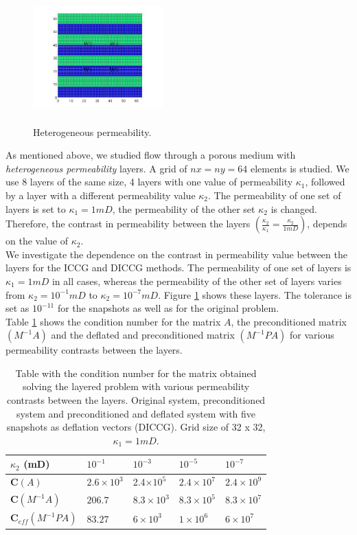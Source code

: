 \documentclass{ecmorXV}
\begin{document}
\normalsize
\begin{figure}[!h]
\centering 
\includegraphics[width=5cm,height=5cm,keepaspectratio]
{perm_he_1.jpg}
\caption{ Heterogeneous permeability.}\label{fig:hep}
\end{figure}
\normalsize
As mentioned above, we studied flow through a porous medium with \emph{heterogeneous permeability} layers. A grid of
$nx = ny = 64$ elements is studied. We use 8 layers of the same size, 
4 layers with one value of permeability $\kappa_1$, followed by a layer with a different permeability value $\kappa_2$. 
The permeability of one set of layers is set to $\kappa_1=1mD$, the permeability of the other set $\kappa_2$ is changed. 
Therefore, the contrast in permeability between the layers $(\frac{\kappa_2}{\kappa_1}=\frac{\kappa_2}{1mD})$,
depends on the value of $\kappa_2$.\\
We investigate the dependence on the contrast in permeability value between the layers for the ICCG and DICCG methods.
The permeability of one set of layers is $\kappa_1=1mD$ in all cases, whereas the permeability of the other set of 
layers varies from $\kappa_2=10^{-1}mD$ to $\kappa_2=10^{-7}mD$. 
Figure \ref{fig:hep} shows these layers. The tolerance is set as $10^{-11}$ for the snapshots as well as for the original problem.\\ 
\normalsize
Table \ref{table:condn} shows the condition number for the matrix $A$, the preconditioned matrix $(M^{-1}A)$ and the deflated and preconditioned matrix 
$(M^{-1}PA)$ for various permeability contrasts between the layers.\\
\renewcommand{\arraystretch}{1.5}
\begin{table}[!ht]
\centering
\begin{tabular}{ |p{3cm}|p{1.5cm}|p{1.5cm}|p{1.5cm}|p{1.5cm}|  } 
 \hline
  $\kappa_2$ (mD) & $10^{-1}$& $10^{-3}$ & $10^{-5}$ & $10^{-7}$\\
  \hline
   $\mathbf{C}(A)$ & $2.6\times10^{3}$ & 2.4$\times10^{5}$&  $2.4\times10^{7}$&  $2.4\times10^{9}$\\ 
   \hline
 $\mathbf{C}(M^{-1}A)$  &$206.7$&$8.3\times10^{3}$&$8.3\times10^{5}$&$8.3\times10^{7}$\\
   \hline
  $\mathbf{C}_{eff}(M^{-1}PA)$ &$83.27$&$6\times10^{3}$&$1\times10^{6}$&$6\times10^{7}$\\
\hline
\end{tabular}
\caption{Table with the condition number for the matrix obtained solving the layered problem with 
various permeability contrasts between the layers. Original system,
preconditioned system and preconditioned and deflated system with five snapshots as deflation vectors (DICCG). 
Grid size of 32 x 32, $\kappa_1=1mD$.}
\label{table:condn}
\end{table}
\end{document}
